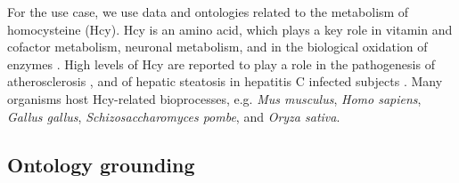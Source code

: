 For the use  case,  we use data  and ontologies  related to the metabolism of homocysteine (Hcy). Hcy is an amino acid, which plays  a key role in vitamin and cofactor  metabolism,  neuronal metabolism,  and in the biological oxidation of enzymes \citep{Selhub1999}. 
%
High levels of Hcy are reported to play a role in the pathogenesis of atherosclerosis \citep{Muniz2006}, and of hepatic steatosis in hepatitis C infected subjects \citep{Siqueira2011b}. Many organisms host Hcy-related bioprocesses, e.g. \textit{Mus musculus}, \textit{Homo sapiens}, \textit{Gallus gallus}, \textit{Schizosaccharomyces pombe}, and \textit{Oryza sativa}.

\subsection*{Ontology grounding}

